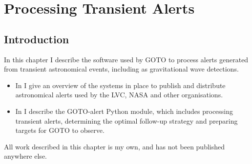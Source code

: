 \chapter{Processing Transient Alerts}
\label{chap:alerts}
\chaptoc{}


\newpage
\section{Introduction}
\label{sec:alerts_intro}
\begin{colsection}

In this chapter I describe the software used by GOTO to process alerts generated from transient astronomical events, including as gravitational wave detections.
%
\begin{itemize}
    \item In  I give an overview of the systems in place to publish and distribute astronomical alerts used by the LVC, NASA and other organisations.
    \item In  I describe the GOTO-alert Python module, which includes processing transient alerts, determining the optimal follow-up strategy and preparing targets for GOTO to observe.
\end{itemize}
%
All work described in this chapter is my own, and has not been published anywhere else.

\end{colsection}


\newpage
